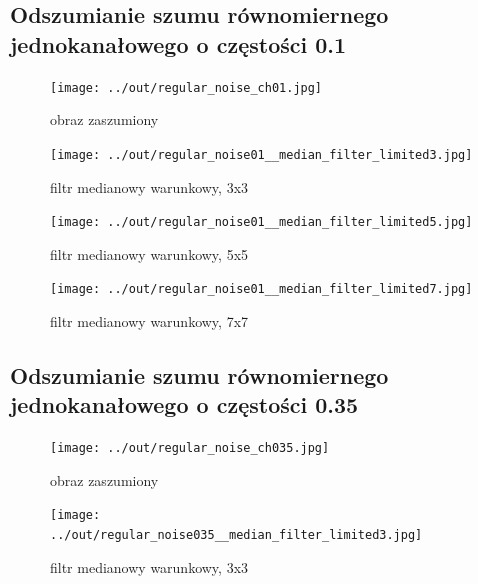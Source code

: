 \documentclass[a4paper,12pt]{article}
\begin{document}
\newpage
\subsection{Odszumianie szumu równomiernego jednokanałowego o częstości 0.1}
\begin{figure}[h!]
\begin{minipage}[t]{7.5cm}
\begin{center}
\texttt{[image: ../out/regular\_noise\_ch01.jpg]}
\caption{obraz zaszumiony}
\end{center}
\end{minipage}
\hfill
\begin{minipage}[t]{7.5cm}
\begin{center}
\texttt{[image: ../out/regular\_noise01\_\_median\_filter\_limited3.jpg]}
\caption{filtr medianowy warunkowy, 3x3}
\end{center}
\end{minipage}
\end{figure}

\begin{figure}[h!]
\begin{minipage}[t]{7.5cm}
\begin{center}
\texttt{[image: ../out/regular\_noise01\_\_median\_filter\_limited5.jpg]}
\caption{filtr medianowy warunkowy, 5x5}
\end{center}
\end{minipage}
\hfill
\begin{minipage}[t]{7.5cm}
\begin{center}
\texttt{[image: ../out/regular\_noise01\_\_median\_filter\_limited7.jpg]}
\caption{filtr medianowy warunkowy, 7x7}
\end{center}
\end{minipage}
\end{figure}


\newpage
\subsection{Odszumianie szumu równomiernego jednokanałowego o częstości 0.35}
\begin{figure}[h!]
\begin{minipage}[t]{7.5cm}
\begin{center}
\texttt{[image: ../out/regular\_noise\_ch035.jpg]}
\caption{obraz zaszumiony}
\end{center}
\end{minipage}
\hfill
\begin{minipage}[t]{7.5cm}
\begin{center}
\texttt{[image: ../out/regular\_noise035\_\_median\_filter\_limited3.jpg]}
\caption{filtr medianowy warunkowy, 3x3}
\end{center}
\end{minipage}
\end{figure}
\end{document}
